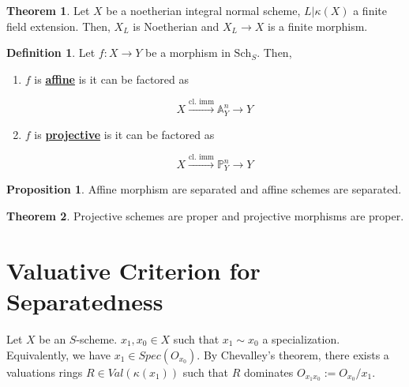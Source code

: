 \documentclass{article}
\theoremstyle{definition}
\newtheorem{theorem}{Theorem}[section]
\theoremstyle{definition}
\newtheorem{definition}{Definition}[theorem]
\theoremstyle{definition}
\theoremstyle{definition}
\newtheorem{proposition}{Proposition}[theorem]
\theoremstyle{definition}
\theoremstyle{definition}
\theoremstyle{definition}
\begin{document}
\begin{tcolorbox}[colback=red!5!white,colframe=red!30!white]
\begin{theorem}
Let $X$ be a noetherian integral normal scheme, $L|\kappa(X)$ a finite field extension. Then, $X_L$ is Noetherian and $X_L\to X$ is a finite morphism. 
\end{theorem}
\end{tcolorbox}


\begin{tcolorbox}[colback=purple!5!white,colframe=purple!75!black]
\begin{definition}
Let $f: X\to Y$ be a morphism in $\textrm{Sch}_S$. Then,
\begin{enumerate}
    \item $f$ is \underline{\textbf{affine}} is it can be factored as 
    
    \[X\xrightarrow{\textrm{cl. imm}} \mathbb{A}^n_Y\to Y\]
    \item $f$ is \underline{\textbf{projective}} is it can be factored as 
    
    \[X\xrightarrow{\textrm{cl. imm}} \mathbb{P}^n_Y\to Y\]
    
\end{enumerate}
\end{definition}
\end{tcolorbox}


\begin{tcolorbox}[colback=blue!5!white,colframe=blue!30!white]
\begin{proposition}
Affine morphism are separated and affine schemes are separated. 
\end{proposition}
\end{tcolorbox}


\begin{tcolorbox}[colback=red!5!white,colframe=red!30!white]
\begin{theorem}
Projective schemes are proper and projective morphisms are proper. 
\end{theorem}
\end{tcolorbox}


\section{Valuative Criterion for Separatedness}

Let $X$ be an $S$-scheme. $x_1,x_0\in X$ such that $x_1\sim x_0$ a specialization. Equivalently, we have $x_1\in Spec(O_{x_0})$. By Chevalley's theorem, there exists a valuations rings $R\in Val(\kappa(x_1))$ such that $R$ dominates $O_{x_1x_0}:= O_{x_0}/x_1$. 
\end{document}
